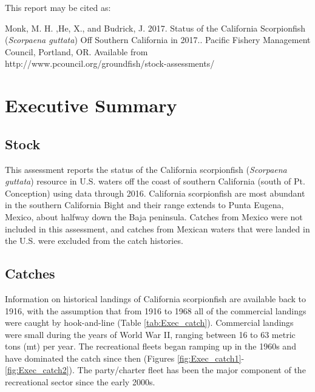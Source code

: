 \documentclass[12pt,]{article}
\begin{document}
\begin{center}
\newpage

\begin{flushleft}
This report may be cited as:

Monk, M. H. ,He, X., and Budrick, J. 2017. Status of the California Scorpionfish (\emph{Scorpaena guttata}) Off Southern California in 2017.. Pacific Fishery Management Council, Portland, OR. Available from http://www.pcouncil.org/groundfish/stock-assessments/
\end{flushleft}

\maketitle

\setcounter{page}{1}
\end{center}

{
\setcounter{tocdepth}{4}
\tableofcontents
}
\setlength{\parskip}{5mm plus1mm minus1mm} \pagebreak

\setcounter{page}{1} \renewcommand{\thefigure}{\alph{figure}}
\renewcommand{\thetable}{\alph{table}}

\section*{Executive Summary}\label{executive-summary}

\subsection*{Stock}\label{stock}

This assessment reports the status of the California scorpionfish
(\emph{Scorpaena guttata}) resource in U.S. waters off the coast of
southern California (south of Pt. Conception) using data through 2016.
California scorpionfish are most abundant in the southern California
Bight and their range extends to Punta Eugena, Mexico, about halfway
down the Baja peninsula. Catches from Mexico were not included in this
assessment, and catches from Mexican waters that were landed in the U.S.
were excluded from the catch histories.

\subsection*{Catches}\label{catches}

Information on historical landings of California scorpionfish are
available back to 1916, with the assumption that from 1916 to 1968 all
of the commercial landings were caught by hook-and-line (Table
\ref{tab:Exec_catch}). Commercial landings were small during the years
of World War II, ranging between 16 to 63 metric tons (mt) per year. The
recreational fleets began ramping up in the 1960s and have dominated the
catch since then (Figures \ref{fig:Exec_catch1}-\ref{fig:Exec_catch2}).
The party/charter fleet has been the major component of the recreational
sector since the early 2000s.
\end{document}
